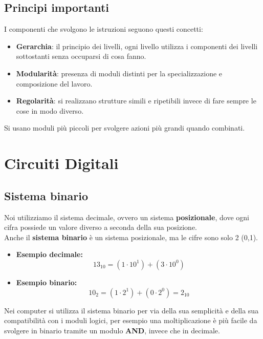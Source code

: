 \documentclass[12pt,a4paper]{article}
\let\oldsection\section
\renewcommand{\section}{\clearpage\oldsection}
\begin{document}
\subsection{Principi importanti}
I componenti che svolgono le istruzioni seguono questi concetti:
\begin{itemize}
    \item \textbf{Gerarchia}: il principio dei livelli, ogni livello utilizza i componenti dei livelli sottostanti senza occuparsi di cosa fanno.
    \item \textbf{Modularità}: presenza di moduli distinti per la specializzazione e composizione del lavoro.
    \item \textbf{Regolarità}: si realizzano strutture simili e ripetibili invece di fare sempre le cose in modo diverso.
\end{itemize}
Si usano moduli più piccoli per svolgere azioni più grandi quando combinati.

\section{Circuiti Digitali}
\subsection{Sistema binario}
Noi utilizziamo il sistema decimale, ovvero un sistema \textbf{posizionale}, dove ogni cifra possiede un valore diverso a seconda della sua posizione.\\
Anche il \textbf{sistema binario} è un sistema posizionale, ma le cifre sono solo 2 (0,1).\\
\begin{itemize}
    \item \textbf{Esempio decimale:}
    \[
    13_{10} = (1 \cdot 10^1) + (3 \cdot 10^0)
    \]
    \item \textbf{Esempio binario:}
    \[
    10_2 = (1 \cdot 2^1) + (0 \cdot 2^0) = 2_{10}
    \]
\end{itemize}
Nei computer si utilizza il sistema binario per via della sua semplicità e della sua compatibilità con i moduli logici, per esempio una moltiplicazione è più facile da svolgere in binario tramite un modulo \textbf{AND}, invece che in decimale.
\end{document}
